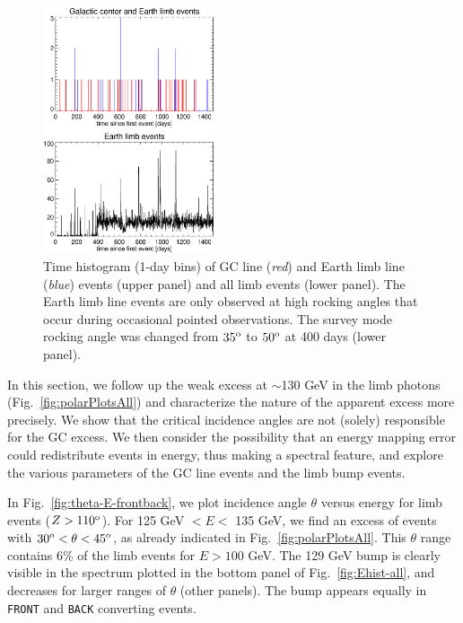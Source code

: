 \documentclass[aps,twocolumn,prd,superscriptaddress,showpacs,nofootinbib,fixfloat]{revtex4}
\newcommand{\degree}{^{\rm o}}
\begin{document}
\begin{figure}
  \centering
  \includegraphics[width=0.45\textwidth]{plots/timehist.ps}
  \caption{Time histogram (1-day bins) of GC line (\emph{red}) and Earth limb
    line (\emph{blue}) events (upper panel) and all limb events (lower panel).
    The Earth limb line events are only observed at high rocking angles that
    occur during occasional pointed observations. The survey mode rocking
    angle was changed from $35\degree$ to $50\degree$ at 400 days (lower
    panel).}
  \label{fig:timehist}
\end{figure}



In this section, we follow up the weak excess at $\sim$130 GeV 
in the limb photons
(Fig.~\ref{fig:polarPlotsAll})
and
characterize the nature of the apparent excess more precisely.  We show that
the critical incidence angles are not (solely) responsible for
the GC excess. 
We then
consider the possibility
that an energy mapping error could redistribute events in energy,
thus making a spectral feature, and
explore the various
parameters of the GC line events and the limb bump events.
\medskip

In Fig.~\ref{fig:theta-E-frontback}, we plot incidence angle $\theta$ versus
energy for limb events ($Z > 110\degree$).  For 125 GeV $< E <$ 135 GeV, we find
an excess of events with $30\degree < \theta < 45\degree$, as already indicated
in Fig.~\ref{fig:polarPlotsAll}.  This $\theta$ range contains 6\% of
the limb events for $E>100$ GeV. The 129 GeV bump is clearly visible in the
spectrum plotted in
the bottom panel of Fig.~\ref{fig:Ehist-all}, and decreases for
larger ranges of $\theta$ (other panels).  The bump appears equally in
\texttt{FRONT} and \texttt{BACK} converting events.
\end{document}
